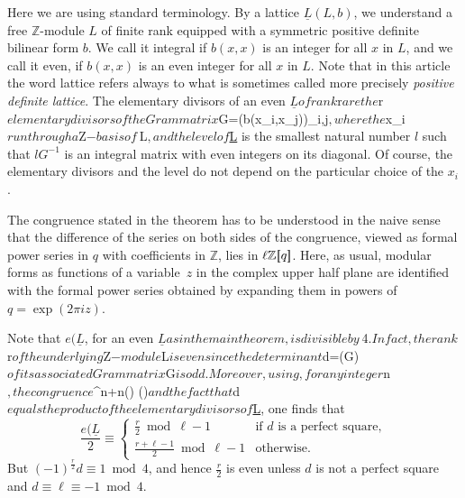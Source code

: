 \documentclass[12pt, a4paper, draft]{article}
\theoremstyle{plain}
\newtheorem*{Main Theorem}{Main Theorem}
\begin{document}
Here we are using standard terminology. By a lattice ${\underline{L}} {\left(L,b\right)}$, we understand a free ${{\mathbb Z}}$-module $L$ of finite rank equipped with
a symmetric positive definite bilinear form $b$. We call it integral
if $b(x,x)$ is an integer for all $x$ in $L$, and we call it even, if
$b(x,x)$ is an even integer for all $x$ in $L$.  Note that in this
article the word lattice refers always to what is sometimes called
more precisely {\it positive definite lattice}.  The elementary
divisors of an even ${\underline{L}} of rank $r$ are the $r$ elementary divisors
of the Gram matrix $G=\big(b(x_i,x_j)\big)_{i,j}$, where the $x_i$ run
through a ${{\mathbb Z}}$-basis of~$L$, and the level of ${\underline{L}} is the smallest
natural number $l$ such that $lG^{-1}$ is an integral matrix with even
integers on its diagonal.  Of course, the elementary divisors and the
level do not depend on the particular choice of the $x_i$.

The congruence stated in the theorem has to be understood in the naive
sense that the difference of the series on both sides of the
congruence, viewed as formal power series in $q$ with coefficients in
${{\mathbb Z}}$, lies in $\ell {{\mathbb Z}}{[\hspace{-2pt}[{q}]\hspace{-2pt}]}$. Here, as usual, modular forms as
functions of a variable~$z$ in the complex upper half plane are
identified with the formal power series obtained by expanding them in
powers of~$q=\exp(2\pi i z)$.

Note that $e({\underline{L}}$, for an even ${\underline{L}} as in the main theorem, is
divisible by~$4$.  In fact, the rank $r$ of the underlying ${{\mathbb Z}}$-module
$L$ is even since the determinant $d=\det(G)$ of its associated Gram
matrix $G$ is odd.  Moreover, using, for any integer $n$, the
congruence $\ell^n+n() ()$ and the fact
that $d$ equals the product of the elementary divisors of ${\underline{L}}, one
finds that
\[
\frac {e({\underline{L}}}2 \equiv
\begin{cases}
  \frac r2 \bmod \ell-1            & \text{if~$d$ is a perfect square},\\
  \frac {r + \ell-1}2 \bmod \ell-1 & \text{otherwise.}
\end{cases}
\]
But $(-1)^{\frac r2}d\equiv 1 \bmod 4$, and hence $\frac r2$ is even
unless $d$ is not a perfect square and $d \equiv \ell \equiv -1 \bmod
4$.
\end{document}
